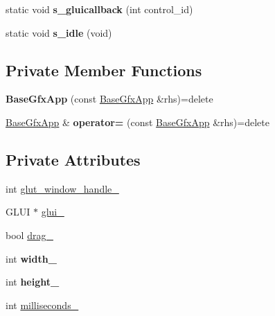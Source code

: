 \begin{DoxyCompactItemize}
\item 
static void {\bfseries s\+\_\+gluicallback} (int control\+\_\+id)\hypertarget{classimage__tools_1_1BaseGfxApp_aa942e268df49e57936fbc236fac1e56f}{}\label{classimage__tools_1_1BaseGfxApp_aa942e268df49e57936fbc236fac1e56f}

\item 
static void {\bfseries s\+\_\+idle} (void)\hypertarget{classimage__tools_1_1BaseGfxApp_a266bbee5189cf299d6be75c7761d2b50}{}\label{classimage__tools_1_1BaseGfxApp_a266bbee5189cf299d6be75c7761d2b50}

\end{DoxyCompactItemize}
\subsection*{Private Member Functions}
\begin{DoxyCompactItemize}
\item 
{\bfseries Base\+Gfx\+App} (const \hyperlink{classimage__tools_1_1BaseGfxApp}{Base\+Gfx\+App} \&rhs)=delete\hypertarget{classimage__tools_1_1BaseGfxApp_a5aa8570ef1617204ac96117108c3e3ed}{}\label{classimage__tools_1_1BaseGfxApp_a5aa8570ef1617204ac96117108c3e3ed}

\item 
\hyperlink{classimage__tools_1_1BaseGfxApp}{Base\+Gfx\+App} \& {\bfseries operator=} (const \hyperlink{classimage__tools_1_1BaseGfxApp}{Base\+Gfx\+App} \&rhs)=delete\hypertarget{classimage__tools_1_1BaseGfxApp_a15d81a2ff9bd6a211c7cc63abd1eb508}{}\label{classimage__tools_1_1BaseGfxApp_a15d81a2ff9bd6a211c7cc63abd1eb508}

\end{DoxyCompactItemize}
\subsection*{Private Attributes}
\begin{DoxyCompactItemize}
\item 
int \hyperlink{classimage__tools_1_1BaseGfxApp_a80d2d760d3c777be50dcfb96466746f0}{glut\+\_\+window\+\_\+handle\+\_\+}
\item 
G\+L\+UI $\ast$ \hyperlink{classimage__tools_1_1BaseGfxApp_af61bab5d0a9ff2bf95c3275b6f895d8e}{glui\+\_\+}
\item 
bool \hyperlink{classimage__tools_1_1BaseGfxApp_aa5d008059dc45fbdd387c1dcc9ef44e8}{drag\+\_\+}
\item 
int {\bfseries width\+\_\+}\hypertarget{classimage__tools_1_1BaseGfxApp_a8888b4592158fb5dd802e5de950777c3}{}\label{classimage__tools_1_1BaseGfxApp_a8888b4592158fb5dd802e5de950777c3}

\item 
int {\bfseries height\+\_\+}\hypertarget{classimage__tools_1_1BaseGfxApp_a42aa79ec7086b16b51264fb9821594e3}{}\label{classimage__tools_1_1BaseGfxApp_a42aa79ec7086b16b51264fb9821594e3}

\item 
int \hyperlink{classimage__tools_1_1BaseGfxApp_a2197d887035883be911d1ced510d99d9}{milliseconds\+\_\+}
\end{DoxyCompactItemize}
